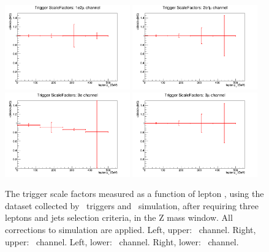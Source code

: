 \begin{figure}[htbp]
	\includegraphics[width=0.48\textwidth]{Appendix/Figures/trigger/Intext/SF_trigger_1e2muhistPt.png}
	\includegraphics[width=0.48\textwidth]{Appendix/Figures/trigger/Intext/SF_trigger_2e1muhistPt.png}
	\includegraphics[width=0.48\textwidth]{Appendix/Figures/trigger/Intext/SF_trigger_3ehistPt.png}
	\includegraphics[width=0.48\textwidth]{Appendix/Figures/trigger/Intext/SF_trigger_3muhistPt.png}
	
	\caption{The trigger scale factors measured as a function of lepton \pt, using the dataset collected by \Etmis\ triggers and \WZ\ simulation, after requiring three leptons and jets selection criteria, in the Z mass window. All corrections to simulation are applied. Left, upper: \emumu\ channel. Right, upper: \eemu\ channel. Left, lower: \eee\ channel. Right, lower: \mumumu\ channel.}
	\label{image:FigurestriggerIntext}
\end{figure}
